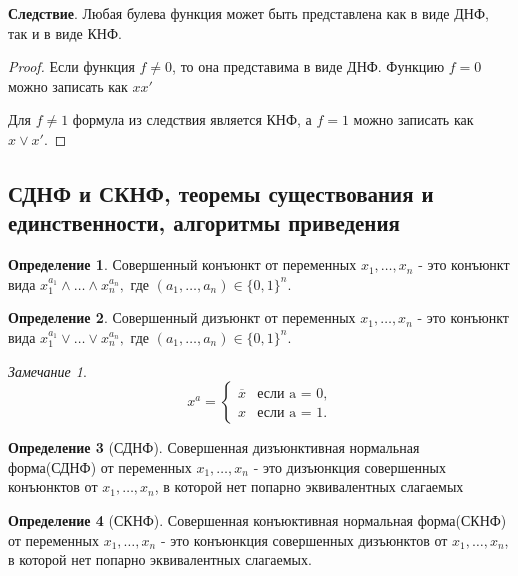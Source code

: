 \documentclass[a4paper]{article}
\theoremstyle{definition}
\newtheorem*{definition}{Определение}
\theoremstyle{remark}
\newtheorem*{remark}{Замечание}
\begin{document}
    \textbf{Следствие}. Любая булева функция может быть представлена как в виде ДНФ, так и в виде КНФ.
    \begin{proof}
        Если функция $f\neq 0$, то она представима в виде ДНФ. Функцию $f = 0$ можно записать как $xx'$

        Для $f\neq 1$ формула из следствия является КНФ, а $f = 1$ можно записать как $x\vee x'$.
    \end{proof}
    \subsection{СДНФ и СКНФ, теоремы существования и единственности, алгоритмы приведения}
	\begin{definition}
		Совершенный конъюнкт от переменных $x_1, \dots , x_n$ - это конъюнкт вида $x_1^{a_1} \wedge\dots \wedge x_n^{a_n},$ где $(a_1, \dots , a_n) \in \{0, 1\}^n.$
	\end{definition}
	\begin{definition}
		Совершенный дизъюнкт от переменных $x_1, \dots , x_n$ - это конъюнкт вида $x_1^{a_1} \vee\dots \vee x_n^{a_n},$ где $(a_1, \dots , a_n) \in \{0, 1\}^n.$
	\end{definition}
	\begin{remark}
		\begin{equation*}
			x^a = 
 			\begin{cases}
   				\overline{x} &\text{если a = 0,}\\
   				x &\text{если a = 1.}
 			\end{cases}
		\end{equation*}
	\end{remark}
	\begin{definition}[СДНФ]
		Совершенная дизъюнктивная нормальная форма(СДНФ) от переменных $x_1, \dots , x_n$  - это дизъюнкция совершенных конъюнктов от $x_1, \dots , x_n$, в которой нет попарно эквивалентных слагаемых
	\end{definition}
	\begin{definition}[СКНФ]
		Совершенная конъюктивная нормальная форма(СКНФ) от переменных $x_1, \dots , x_n$ - это конъюнкция совершенных дизъюнктов от $x_1, \dots , x_n$, в которой нет попарно эквивалентных слагаемых.
	\end{definition}
\end{document}
